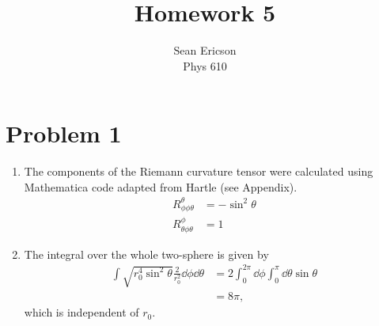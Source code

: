 \documentclass[12pt]{article}
\begin{document}
\title{Homework 5}
\author{Sean Ericson \\ Phys 610}
\maketitle

\section*{Problem 1}
\begin{enumerate}[label=(\alph*)]
    \item The components of the Riemann curvature tensor were calculated using Mathematica code adapted from Hartle (see Appendix).
    \begin{align*}
        R_{\phi\phi\theta}^\theta &= -\sin^2\theta \\
        R_{\theta\phi\theta}^\phi &= 1
    \end{align*}

    \item The integral over the whole two-sphere is given by
    \begin{align*}
        \int \sqrt{r_0^4\sin^2\theta}\frac{2}{r_0^2}\dd\phi\dd\theta &= 2\int_0^{2\pi}\dd\phi\int_0^\pi\dd\theta \sin\theta \\
        &= 8\pi,
    \end{align*}
    which is independent of $r_0$.
\end{enumerate}
\end{document}
